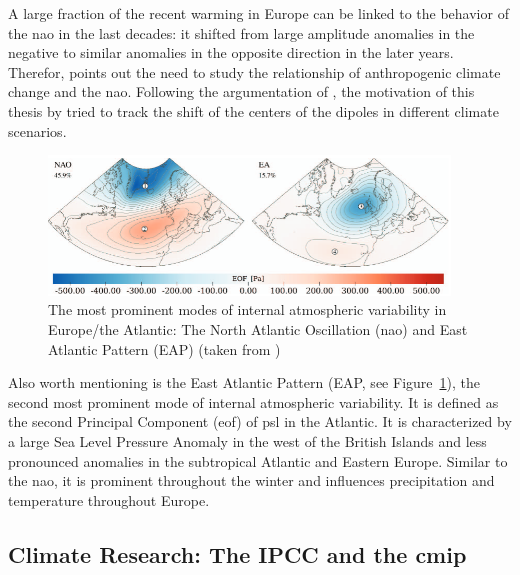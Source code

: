 A large fraction of the recent warming in Europe can be linked to the behavior of the \ac{nao} in the last decades: it shifted from large amplitude anomalies in the negative to similar anomalies in the opposite direction in the later years. 
Therefor, \citeauthor{hurrell_overview_2003} points out the need to study the relationship of anthropogenic climate change and the \ac{nao}. 
Following the argumentation of , the motivation of this thesis by  tried to track the shift of the centers of the dipoles in different climate scenarios.   

\begin{figure}
  \begin{center}
    \includegraphics[width=0.95\textwidth]{figures/nao_eap.png}
  \end{center}
  \caption{The most prominent modes of internal atmospheric variability in Europe/the Atlantic: The North Atlantic Oscillation (\ac{nao}) and East Atlantic Pattern (EAP) (taken from \cite{vietinghoff_extension_2021})}\label{fig:nao eap}
\end{figure}


Also worth mentioning is the East Atlantic Pattern (EAP, see Figure~\ref{fig:nao eap}), the second most prominent mode of internal atmospheric variability.
It is defined as the second Principal Component (\ac{eof}) of \ac{psl} in the Atlantic.  
It is characterized by a large Sea Level Pressure Anomaly in the west of the British Islands and less pronounced  anomalies in the subtropical Atlantic and Eastern Europe. 
Similar to the \ac{nao}, it is prominent throughout the winter and influences precipitation and temperature throughout Europe. \cite{comas-bru_effect_2016, song_east_2019}

\subsection{Climate Research: The IPCC and the \ac{cmip}}
\label{sec:climate research}


